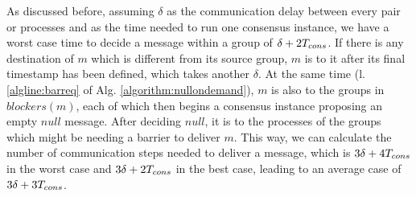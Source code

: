 \documentclass[times, 10pt]{article}
\begin{document}
 
As discussed before, assuming $\delta$ as the communication delay between every pair or processes and \tcons{} as the time needed to run one consensus instance, we have a worst case time to decide a message within a group of $\delta + 2T_{cons}$. If there is any destination of $m$ which is different from its source group, $m$ is \rmcast{} to it after its final timestamp has been defined, which takes another $\delta$. At the same time (l. \ref{algline:barreq} of Alg. \ref{algorithm:nullondemand}), $m$ is \rmcast{} also to the groups in $blockers(m)$, each of which then begins a consensus instance proposing an empty $null$ message. After deciding $null$, it is \rmcast{} to the processes of the groups which might be needing a barrier to deliver $m$. This way, we can calculate the number of communication steps needed to deliver a message, which is $3\delta + 4T_{cons}$ in the worst case and $3\delta + 2T_{cons}$ in the best case, leading to an average case of $3\delta + 3T_{cons}$.
\end{document}
